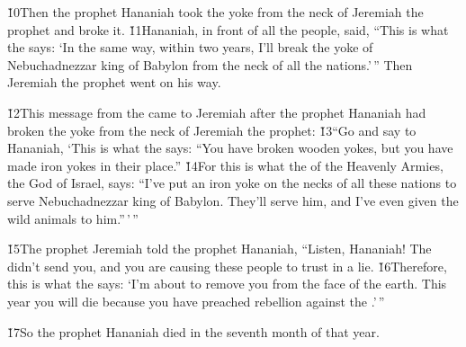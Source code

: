 \v{10}Then the prophet Hananiah took the yoke from the neck of Jeremiah the prophet and broke it. \v{11}Hananiah, in front of all the people, said, ``This is what the  says: `In the same way, within two years, I'll break the yoke of Nebuchadnezzar king of Babylon from the neck of all the nations.'\,'' Then Jeremiah the prophet went on his way.

\v{12}This message from the  came to Jeremiah after the prophet Hananiah had broken the yoke from the neck of Jeremiah the prophet: \v{13}``Go and say to Hananiah, `This is what the  says: ``You have broken wooden yokes, but you have made iron yokes in their place.'' \v{14}For this is what the  of the Heavenly Armies, the God of Israel, says: ``I've put an iron yoke on the necks of all these nations to serve Nebuchadnezzar king of Babylon. They'll serve him, and I've even given the wild animals to him.''\,'\,''

\v{15}The prophet Jeremiah told the prophet Hananiah, ``Listen, Hananiah! The  didn't send you, and you are causing these people to trust in a lie. \v{16}Therefore, this is what the  says: `I'm about to remove you from the face of the earth. This year you will die because you have preached rebellion against the .'\,''

\v{17}So the prophet Hananiah died in the seventh month of that year.

